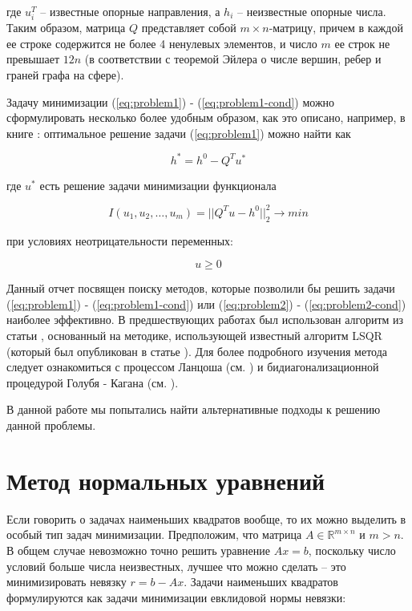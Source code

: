 \documentclass[a4paper, 12pt, titlepage]{article}
\theoremstyle{definition}
\theoremstyle{plain}
\theoremstyle{plain}
\begin{document}
где $u_{i}^{T}$ -- известные опорные направления, а $h_{i}$ -- неизвестные
опорные числа. Таким образом, матрица $Q$ представляет собой $m \times
n$-матрицу, причем в каждой ее строке содержится не более 4 ненулевых элементов,
и число $m$ ее строк не превышает $12 n$ (в соответствии с теоремой Эйлера о
числе вершин, ребер и граней графа на сфере).

Задачу минимизации (\ref{eq:problem1}) - (\ref{eq:problem1-cond}) можно
сформулировать несколько более удобным образом, как это описано, например, в
книге \cite{BertsekasTsitsiklis1989}: оптимальное решение задачи
(\ref{eq:problem1}) можно найти как

\begin{equation}
\label{eq:problem2}
 h^{*} = h^{0} - Q^{T} u^{*}
\end{equation}

где $u^{*}$ есть решение задачи минимизации функционала

\begin{equation}
\label{eq:problem2-cond}
 I(u_{1}, u_{2}, \ldots, u_{m}) = ||Q^{T} u - h^{0}||_{2}^{2} \to min
\end{equation}

при условиях неотрицательности переменных:

\begin{equation}
 u \geq 0
\end{equation}

Данный отчет посвящен поиску методов, которые позволили бы решить задачи
(\ref{eq:problem1}) - (\ref{eq:problem1-cond}) или (\ref{eq:problem2}) -
(\ref{eq:problem2-cond}) наиболее эффективно. В предшествующих работах был
использован алгоритм из статьи \cite{BierlaireTointTuyttens1991}, основанный
на методике, использующей известный алгоритм LSQR (который был опубликован в 
статье \cite{PaigeSaunders1982}). Для более подробного изучения метода
следует ознакомиться с процессом Ланцоша (см. \cite{Lanczos1950}) и
бидиагонализационной процедурой Голубя - Кагана (см. \cite{Golub1965}).

В данной работе мы попытались найти альтернативные подходы к решению данной 
проблемы.

\section{Метод нормальных уравнений}

Если говорить о задачах наименьших квадратов вообще, то их можно выделить в
особый тип задач минимизации. Предположим, что матрица $A \in \mathbb{R}^{m
\times n}$ и $m > n$. В общем случае невозможно точно решить уравнение
$A x = b$, поскольку число условий больше числа неизвестных, лучшее что можно
сделать -- это минимизировать невязку $r = b - A x$. Задачи наименьших
квадратов формулируются как задачи минимизации евклидовой нормы невязки:
\end{document}
